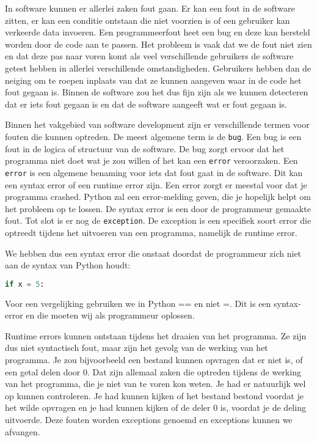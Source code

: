 In software kunnen er allerlei zaken fout gaan. Er kan een fout in de software zitten, er kan een conditie ontstaan die niet voorzien is of een gebruiker kan verkeerde data invoeren. Een programmeerfout heet een bug en deze kan hersteld worden door de code aan te passen. Het probleem is vaak dat we de fout niet zien en dat deze pas naar voren komt als veel verschillende gebruikers de software getest hebben in allerlei verschillende omstandigheden. Gebruikers hebben dan de neiging om te roepen  inplaats van dat ze kunnen aangeven waar in de code het fout gegaan is. Binnen de software zou het dus fijn zijn als we kunnen detecteren dat er iets fout gegaan is en dat de software aangeeft wat er fout gegaan is.

Binnen het vakgebied van software development zijn er verschillende termen voor fouten die kunnen optreden. De meest algemene term is de \texttt{bug}. Een bug is een fout in de logica of structuur van de software. De bug zorgt ervoor dat het programma niet doet wat je zou willen of het kan een \texttt{error} veroorzaken. Een \texttt{error} is een algemene benaming voor iets dat fout gaat in de software. Dit kan een syntax error of een runtime error zijn. Een error zorgt er meestal voor dat je programma crashed. Python zal een error-melding geven, die je hopelijk helpt om het probleem op te lossen. De syntax error is een door de programmeur gemaakte fout. Tot slot is er nog de \texttt{exception}. De exception is een specifiek soort error die optreedt tijdens het uitvoeren van een programma, namelijk de runtime error.

We hebben dus een syntax error die onstaat doordat de programmeur zich niet aan de syntax van Python houdt:
\begin{lstlisting}[language=python]
if x = 5:
\end{lstlisting}
Voor een vergelijking gebruiken we in Python == en niet =. Dit is een syntax-error en die moeten wij als programmeur oplossen.

Runtime errors kunnen ontstaan tijdens het draaien van het programma. Ze zijn dus niet syntactisch fout, maar zijn het gevolg van de werking van het programma. Je zou bijvoorbeeld een bestand kunnen opvragen dat er niet is, of een getal delen door 0. Dat zijn allemaal zaken die optreden tijdens de werking van het programma, die je niet van te voren kon weten. Je had er natuurlijk wel op kunnen controleren. Je had kunnen kijken of het bestand bestond voordat je het wilde opvragen en je had kunnen kijken of de deler 0 is, voordat je de deling uitvoerde. Deze fouten worden exceptions genoemd en exceptions kunnen we afvangen.


